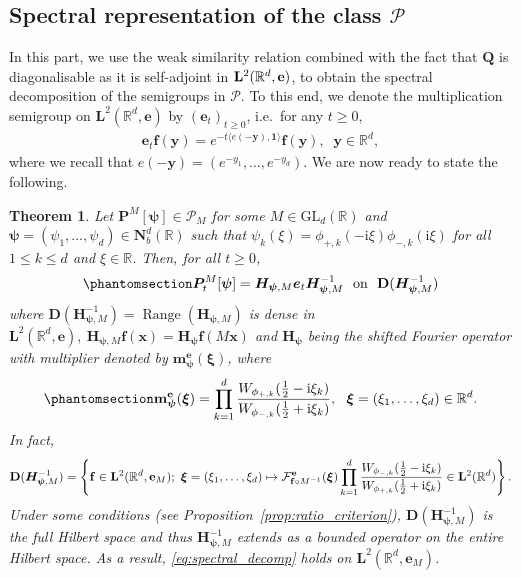 \documentclass[12pt]{amsart}
\newcommand{\hlabel}{\phantomsection\label}
\numberwithin{equation}{section}
\newcommand{\bb}{\mathbb}
\newcommand{\ccP}{\mathscr{P}}
\renewcommand{\ge}{\geqslant}
\renewcommand{\le}{\leqslant}
\renewcommand{\geq}{\geqslant}
\newcommand{\bmrm}[2][2]{\mathbf{#2}^{#1}}
\newcommand{\Range}{\operatorname{Range}}
\newcommand{\fouh}{\mathcal{F}^{\mathbf{e}}}
\newcommand{\HMd}{\bm{H}^{-1}_{\bm{\psi},M}}
\newcommand{\Hpsi}{H_\psi}
\newcommand{\D}{\mathbf{D}}
\newcommand{\LLRe}{\bmrm{L}(\bb R^d,{\bf e})}
\newcommand{\mm}{\mathbf{m}}
\newcommand{\f}{\mathbf{f}}
\newtheorem{thm}{Theorem}[section]
\theoremstyle{definition}
\theoremstyle{assump}
\theoremstyle{remark}
\begin{document}
\subsection{Spectral representation of the class $\mathscr{P}$}
In this part, we use  the weak similarity relation  combined with the fact that $\bm{Q}$ is diagonalisable as it is self-adjoint in $\LLRe$, to obtain the spectral decomposition of the semigroups in $\ccP$. %
To this end, we denote the multiplication semigroup on $\bmrm{L}(\bb{R}^d,\mathbf{e})$ by $(\bm{e}_t)_{t\geq 0}$, i.e.~for any $t\geq0$,
\begin{align}
	\bm{e}_t \f(\bm{y})={e}^{-t\langle e(-\bm{y}),\bm{1}\rangle}\f(\bm{y}), \;\; \bm{y}\in\bb{R}^d, %
\end{align}
where we recall that  $e(-\bm{y})=\left(e^{-y_1}, \ldots, e^{-y_d}\right)$.
We are now ready to state the following.
\begin{thm}\hlabel{th:spectral_decomp}
	Let $\bm{P}^M[\bm{\psi}] \in \ccP_M$ for some $M\in\mathrm{GL}_d(\bb R)$ and $\bm{\psi}=(\psi_1,\ldots,\psi_d)\in\mathbf{N}^d_b(\bb{R})$ such that $\psi_k(\xi)=\phi_{+,k}(-\mathrm{i}\xi)\phi_{-,k}(\mathrm{i}\xi)$ for all $1\le k\le d$ and $\xi\in\bb{R}$. Then, for all $t\ge 0$, %
		\begin{align}\hlabel{eq:spectral_decomp}
			\bm{P}^M_t[\bm{\psi}] =\bm{H}_{\bm{\psi},M}\bm{e}_t \bm{H}^{-1}_{\bm{\psi},M} \ \mbox{ on } \ \D(\bm{H}^{-1}_{\bm{\psi},M})
		\end{align}
		where  $\D(\bm{H}^{-1}_{\bm{\psi},M})=\Range(\bm{H}_{\bm{\psi},M})$ is dense in $\bmrm{L}(\bb{R}^d,\mathbf{e}), \
		\bm{H}_{\bm{\psi},M}\f(\bm x)=\bm{\Hpsi}\f(M \bm x)$ and $\bm{H}_{\bm{\psi}}$ being the shifted Fourier  operator with  multiplier denoted by $\mm^{\mathbf{e}}_{\bm \psi}(\bm \xi)$, where
		\begin{equation}\hlabel{eq:Mult}
			\mm^{\mathbf{e}}_{\bm \psi}(\bm \xi)=\prod_{k=1}^d\frac{W_{\phi_{+,k}}(\frac{1}{2}-{\rm{i}}\xi_k)}{W_{\phi_{-,k}}(\frac{1}{2}+{\rm i}\xi_k)},\ \ \bm{\xi}=(\xi_1, \ldots,\xi_d)\in\bb{R}^d.
		\end{equation}
		In fact,
		\[\D(\bm{H}^{-1}_{\bm{\psi},M})=\left\{\f\in\bmrm{L}(\bb{R}^d,{\mathbf{e}}_M);\ \bm{\xi}=(\xi_1,\ldots,\xi_d) \mapsto\fouh_{\f\circ M^{-1}}(\bm{\xi})\prod_{k=1}^d\frac{W_{\phi_{-,k}}(\frac{1}{2}-{\rm{i}}\xi  _k)}{W_{\phi_{+,k}}(\frac{1}{2}+{\rm{i}}\xi  _k)}\in\bmrm{L}(\bb{R}^d)\right\}. \]
		Under some conditions (see Proposition~\ref{prop:ratio_criterion}), $\D(\bm{H}^{-1}_{\bm{\psi},M})$ is the full Hilbert space and thus $\HMd$ extends as a bounded operator on the entire Hilbert space. As a result, \eqref{eq:spectral_decomp} holds on $\bmrm{L}(\bb{R}^d,{\mathbf{e}}_M)$.
		
	\end{thm}
\end{document}
